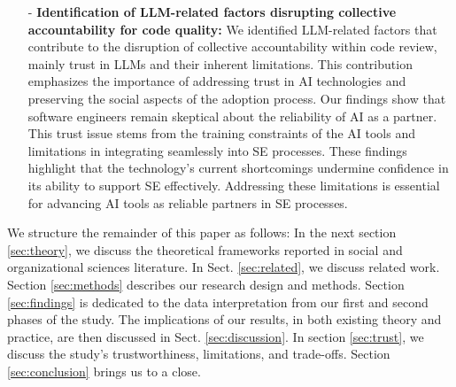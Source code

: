 \begin{itemize}
    \item [-] \textbf{Identification of LLM-related factors disrupting collective accountability for code quality:} We identified LLM-related factors that contribute to the disruption of collective accountability within code review, mainly trust in LLMs and their inherent limitations. This contribution emphasizes the importance of addressing trust in AI technologies and preserving the social aspects of the adoption process. Our findings show that software engineers remain skeptical about the reliability of AI as a partner. This trust issue stems from the training constraints of the AI tools and limitations in integrating seamlessly into SE processes. These findings highlight that the technology's current shortcomings undermine confidence in its ability to support SE effectively. Addressing these limitations is essential for advancing AI tools as reliable partners in SE processes.
    
\end{itemize}

We structure the remainder of this paper as follows: In the next section \ref{sec:theory}, we discuss the theoretical frameworks reported in social and organizational sciences literature. In Sect. \ref{sec:related}, we discuss related work. Section \ref{sec:methods} describes our research design and methods. Section \ref{sec:findings} is dedicated to the data interpretation from our first and second phases of the study. The implications of our results, in both existing theory and practice, are then discussed in Sect. \ref{sec:discussion}. In section \ref{sec:trust}, we discuss the study's trustworthiness, limitations, and trade-offs. Section \ref{sec:conclusion} brings us to a close.


    


